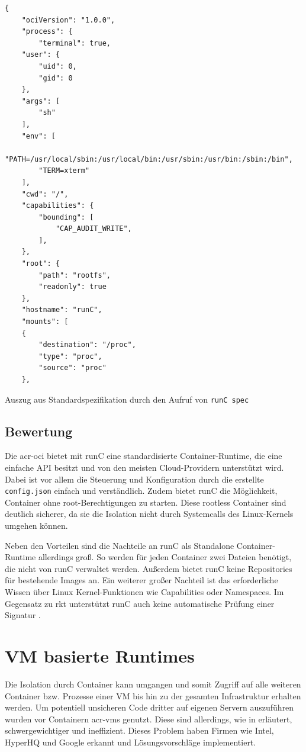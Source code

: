 \begin{listing}[H]
	\begin{verbatim}
{
	"ociVersion": "1.0.0",
	"process": {
		"terminal": true,
	"user": {
		"uid": 0,
		"gid": 0
	},
	"args": [
		"sh"
	],
	"env": [
		"PATH=/usr/local/sbin:/usr/local/bin:/usr/sbin:/usr/bin:/sbin:/bin",
		"TERM=xterm"
	],
	"cwd": "/",
	"capabilities": {
		"bounding": [
			"CAP_AUDIT_WRITE",
		],
	},
	"root": {
		"path": "rootfs",
		"readonly": true
	},
	"hostname": "runC",
	"mounts": [
	{
		"destination": "/proc",
		"type": "proc",
		"source": "proc"
	},
	\end{verbatim}
	\caption{Auszug aus Standardspezifikation durch den Aufruf von \texttt{runC spec}}
	\label{lst:configJSON}
\end{listing}


\subsection{Bewertung}
\label{sec:comprunCBewertung}

Die \gls{acr-oci} bietet mit runC eine standardisierte Container-Runtime, die eine einfache API besitzt und von den meisten Cloud-Providern unterstützt wird. Dabei ist vor allem die Steuerung und Konfiguration durch die erstellte \texttt{config.json} einfach und verständlich. Zudem bietet runC die Möglichkeit, Container ohne root-Berechtigungen zu starten. Diese rootless Container sind deutlich sicherer, da sie die Isolation nicht durch Systemcalls des Linux-Kernels umgehen können.

Neben den Vorteilen sind die Nachteile an runC als Standalone Container-Runtime allerdings groß. So werden für jeden Container zwei Dateien benötigt, die nicht von runC verwaltet werden. Außerdem bietet runC keine Repositories für bestehende Images an. Ein weiterer großer Nachteil ist das erforderliche Wissen über Linux Kernel-Funktionen wie Capabilities oder Namespaces. Im Gegensatz zu rkt unterstützt runC auch keine automatische Prüfung einer Signatur \citep{RktVsOtherProjects}. 

\section{VM basierte Runtimes}
\label{sec:compVMbased}
Die Isolation durch Container kann umgangen und somit Zugriff auf alle weiteren Container bzw. Prozesse einer VM bis hin zu der gesamten Infrastruktur erhalten werden. Um potentiell unsicheren Code dritter auf eigenen Servern auszuführen wurden vor Containern \glspl{acr-vm} genutzt. Diese sind allerdings, wie in  erläutert, schwergewichtiger und ineffizient. Dieses Problem haben Firmen wie Intel, HyperHQ und Google erkannt und Lösungsvorschläge implementiert.

